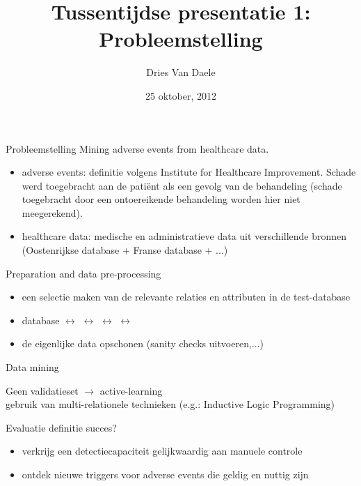 \documentclass{beamer}
\title[Tussentijde presentatie 1: Probleemstelling]
{Tussentijdse presentatie 1: Probleemstelling}
\author[Dries Van Daele]{Dries Van Daele}
\institute{DTAI masterproef KULeuven}
\date{25 oktober, 2012}
\begin{document}
\begin{frame}{}
\titlepage
\end{frame}

\begin{frame}{Probleemstelling}
Mining adverse events from healthcare data.
  \begin{itemize}
    \item adverse events: definitie volgens Institute for Healthcare Improvement. Schade werd toegebracht aan de pati\"{e}nt als een gevolg van de behandeling (schade toegebracht door een ontoereikende behandeling worden hier niet meegerekend).
    \item healthcare data: medische en administratieve data uit verschillende bronnen (Oostenrijkse database + Franse database + ...)
  \end{itemize}
\end{frame}

\begin{frame}{Preparation and data pre-processing}
  \begin{itemize}
    \item een selectie maken van de relevante relaties en attributen in de test-database
    \item {\scriptsize{database $\leftrightarrow$  $\leftrightarrow$  $\leftrightarrow$  $\leftrightarrow$ }}
    \item de eigenlijke data opschonen  (sanity checks uitvoeren,...)
  \end{itemize}
\end{frame}

\begin{frame}{Data mining}

Geen validatieset $\rightarrow$ active-learning\\
gebruik van multi-relationele technieken (e.g.: Inductive Logic Programming)

\end{frame}

\begin{frame}{Evaluatie}
definitie succes?
  \begin{itemize}
    \item verkrijg een detectiecapaciteit gelijkwaardig aan manuele controle
    \item ontdek nieuwe triggers voor adverse events die geldig en nuttig zijn
  \end{itemize}
\end{frame}
\end{document}
